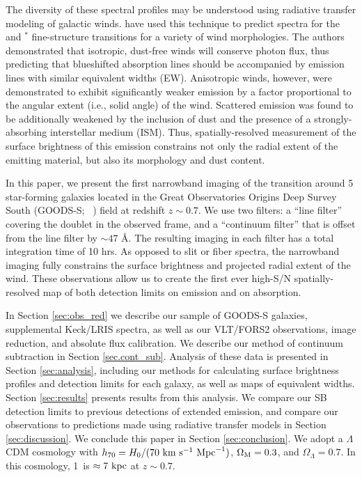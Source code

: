 \documentclass[twocolumn]{aastex62}
\newcommand{\citethnop}[1]{\citeauthor{#1}\ \citeyear{#1}}
\begin{document}
The diversity of these spectral profiles may be understood using radiative transfer modeling of galactic winds. \citet{Prochaska_2011} have used this technique to predict 
spectra for the   and  $^*$ fine-structure transitions for a variety of wind morphologies. The authors demonstrated that isotropic, dust-free winds will conserve photon flux, thus predicting that blueshifted absorption lines should be accompanied by emission lines with similar equivalent widths (EW). Anisotropic winds, however, were demonstrated to exhibit significantly weaker emission by a factor proportional to the angular extent (i.e., solid angle) of the wind. Scattered emission was found to be additionally weakened by the inclusion of dust and the presence of a strongly-absorbing interstellar medium (ISM). Thus, spatially-resolved measurement of the surface brightness of this emission constrains not only the radial extent of the emitting material, but also its morphology and dust content.

In this paper, we present the first narrowband imaging of the  transition around 5 star-forming  galaxies located in the Great Observatories Origins Deep Survey South (GOODS-S; \citethnop{Giavalisco2004})  field at redshift $z \sim 0.7$. 
We use two filters: a  ``line filter'' covering the  doublet in the observed frame, and a ``continuum filter'' that is offset from the line filter by ${\sim}47$ \AA.    
The resulting imaging in each filter has a total integration time of 10 hrs. As opposed to slit or fiber spectra, the narrowband imaging fully constrains the surface brightness and projected radial extent of the wind. These observations allow us to create the first ever high-S/N spatially-resolved map of both detection limits on  emission and on  absorption. 

In Section \ref{sec:obs_red} we describe our sample of GOODS-S galaxies, supplemental Keck/LRIS spectra, as well as our VLT/FORS2 observations, image reduction, and absolute flux calibration. We describe our method of continuum subtraction in Section \ref{sec.cont_sub}. Analysis of these data is presented in Section \ref{sec:analysis}, 
including our methods for calculating surface brightness profiles and detection limits for each galaxy, as well as maps of  equivalent widths.
Section \ref{sec:results} presents results from this analysis. We compare our SB detection limits to previous detections of extended  emission,  and compare our observations to predictions made using radiative transfer models in Section \ref{sec:discussion}. We conclude this paper in Section \ref{sec:conclusion}.
We adopt a $\Lambda$CDM cosmology with $h_{70} = H_0/(70\ \rm{ km}\ \rm{ s}^{-1}\ \rm{ Mpc}^{-1})$, $\Omega_{\rm{M}}= 0.3$, and $\Omega_{\Lambda} = 0.7$. In this cosmology, 1\arcsec\  is $\approx 7\ \rm kpc$ at $z \sim 0.7$.
\end{document}
